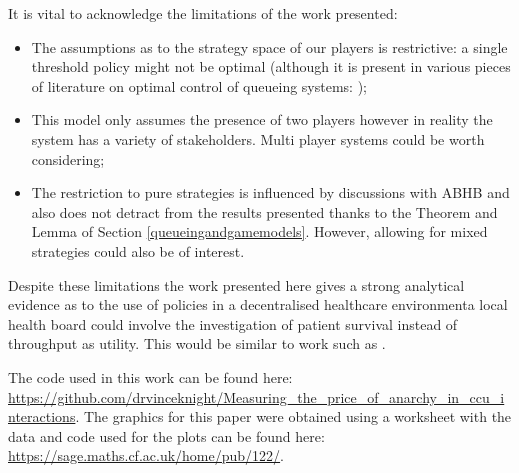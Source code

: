 \documentclass{article}
\begin{document}
It is vital to acknowledge the limitations of the work presented:

\begin{itemize}
    \item The assumptions as to the strategy space of our players is restrictive: a single threshold policy might not be optimal (although it is present in various pieces of literature on optimal control of queueing systems: \cite{knight2012comparisons, naor1969regulation});
    \item This model only assumes the presence of two players however in reality the system has a variety of stakeholders. Multi player systems could be worth considering;
    \item The restriction to pure strategies is influenced by discussions with ABHB and also does not detract from the results presented thanks to the Theorem and Lemma of Section \ref{queueingandgamemodels}.  However, allowing for mixed strategies could also be of interest.
\end{itemize}

Despite these limitations the work presented here gives a strong analytical evidence as to the use of policies in a decentralised healthcare environmenta local health board could involve the investigation of patient survival instead of throughput as utility.
This would be similar to work such as \cite{erkut2008ambulance, knight2012ambulance}.

The code used in this work can be found here: \url{https://github.com/drvinceknight/Measuring_the_price_of_anarchy_in_ccu_interactions}.
The graphics for this paper were obtained using \cite{Hunter:2007, sage} a worksheet with the data and code used for the plots can be found here: \url{https://sage.maths.cf.ac.uk/home/pub/122/}.

\newpage


\end{document}
